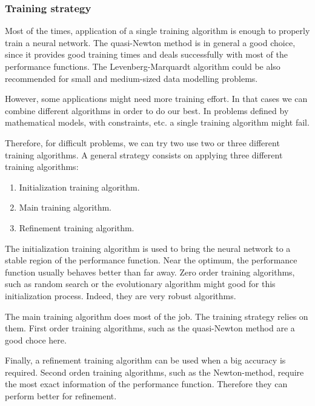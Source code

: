 \subsubsection{Training strategy}

Most of the times, application of a single training algorithm is enough to properly train a neural network. 
The quasi-Newton method is in general a good choice, since it provides good training times and deals successfully with most of the performance functions. 
The Levenberg-Marquardt algorithm could be also recommended for small and medium-sized data modelling problems. 
 
However, some applications might need more training effort. 
In that cases we can combine different algorithms in order to do our best. 
In problems defined by mathematical models, with constraints, etc. a single training algorithm might fail. 

Therefore, for difficult problems, we can try two use two or three different training algorithms. 
A general strategy consists on applying three different training algorithms: 

\begin{enumerate}
\item Initialization training algorithm. 
\item Main training algorithm. 
\item Refinement training algorithm. 
\end{enumerate}

The initialization training algorithm is used to bring the neural network to a stable region of the performance function.
Near the optimum, the performance function usually behaves better than far away. 
Zero order training algorithms, such as random search or the evolutionary algorithm might good for this initialization process. 
Indeed, they are very robust algorithms. 

The main training algorithm does most of the job. The training strategy relies on them. 
First order training algorithms, such as the quasi-Newton method are a good choce here. 

Finally, a refinement training algorithm can be used when a big accuracy is required. 
Second orden training algorithms, such as the Newton-method, require the most exact information of the performance function. Therefore they can perform better for refinement. 

